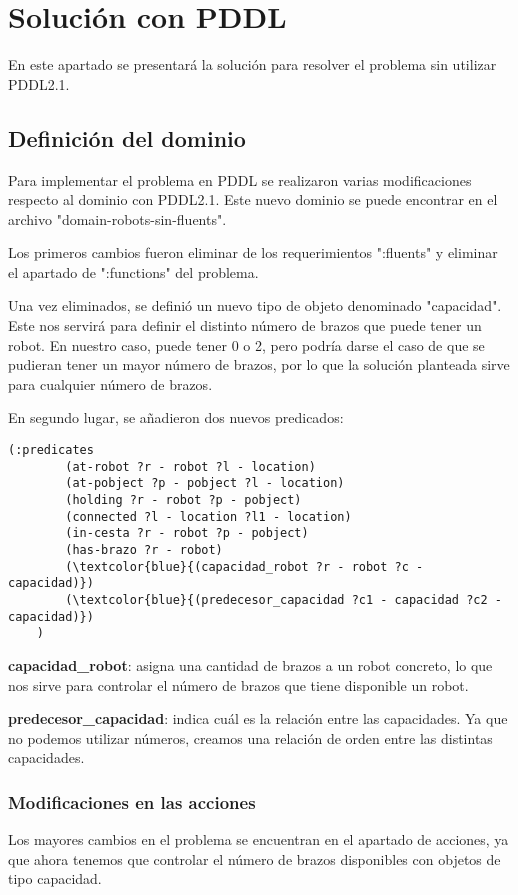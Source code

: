 \documentclass{article}
\begin{document}
\section{Solución con PDDL}
En este apartado se presentará la solución para resolver el problema sin utilizar PDDL2.1.

\subsection{Definición del dominio}
Para implementar el problema en PDDL se realizaron varias modificaciones respecto al dominio con PDDL2.1.
 Este nuevo dominio se puede encontrar en el archivo "domain-robots-sin-fluents". 

Los primeros cambios fueron eliminar de los requerimientos ":fluents" y eliminar el apartado de ":functions" del problema.

Una vez eliminados, se definió un nuevo tipo de objeto denominado "capacidad". Este nos servirá para definir el distinto número de 
brazos que puede tener un robot. En nuestro caso, puede tener 0 o 2, pero podría darse el caso de que se pudieran tener un mayor número 
de brazos, por lo que la solución planteada sirve para cualquier número de brazos.

En segundo lugar, se añadieron dos nuevos predicados:
\begin{Verbatim}[commandchars=\\\{\}]
    (:predicates
        (at-robot ?r - robot ?l - location)
        (at-pobject ?p - pobject ?l - location)
        (holding ?r - robot ?p - pobject)
        (connected ?l - location ?l1 - location)
        (in-cesta ?r - robot ?p - pobject)
        (has-brazo ?r - robot)
        (\textcolor{blue}{(capacidad_robot ?r - robot ?c - capacidad)})
        (\textcolor{blue}{(predecesor_capacidad ?c1 - capacidad ?c2 - capacidad)})
    )
\end{Verbatim}

\textbf{capacidad\_robot}: asigna una cantidad de brazos a un robot concreto, lo que nos sirve para controlar el número de brazos que tiene disponible un robot.

\textbf{predecesor\_capacidad}: indica cuál es la relación entre las capacidades. Ya que no podemos utilizar números, 
creamos una relación de orden entre las distintas capacidades.

\subsubsection{Modificaciones en las acciones}
Los mayores cambios en el problema se encuentran en el apartado de acciones, ya que ahora tenemos que controlar el número de brazos disponibles con objetos de tipo capacidad.
\end{document}
